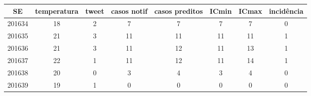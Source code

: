 \begin{tabular}{c|ccccccc}
  \hline
SE & temperatura & tweet & casos notif & casos preditos & ICmin & ICmax & incidência \\ 
  \hline
201634 & 18 & 2 & 7 & 7 & 7 & 7 & 0 \\ 
  201635 & 21 & 3 & 11 & 11 & 11 & 11 & 1 \\ 
  201636 & 21 & 3 & 11 & 12 & 11 & 13 & 1 \\ 
  201637 & 22 & 1 & 11 & 12 & 11 & 14 & 1 \\ 
  201638 & 20 & 0 & 3 & 4 & 3 & 4 & 0 \\ 
  201639 & 19 & 1 & 0 & 0 & 0 & 0 & 0 \\ 
   \hline
\end{tabular}

